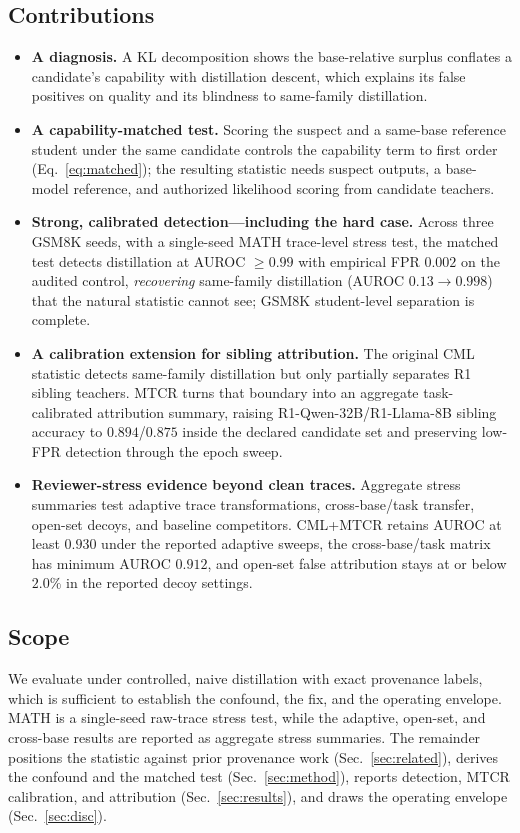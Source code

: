 \documentclass[journal]{IEEEtran}
\begin{document}
\subsection{Contributions}
\begin{itemize}
  \item \textbf{A diagnosis.} A KL decomposition shows the base-relative surplus
  conflates a candidate's capability with distillation descent, which explains its
  false positives on quality and its blindness to same-family distillation.
  \item \textbf{A capability-matched test.} Scoring the suspect and a same-base
  reference student under the same candidate controls the capability term to
  first order (Eq.~\eqref{eq:matched}); the resulting statistic needs suspect outputs, a
  base-model reference, and authorized likelihood scoring from candidate teachers.
  \item \textbf{Strong, calibrated detection---including the hard case.} Across three
  GSM8K seeds, with a single-seed MATH trace-level stress test, the matched test detects distillation at AUROC $\geq0.99$
  with empirical FPR $0.002$ on the audited control, \emph{recovering} same-family distillation (AUROC $0.13\!\to\!0.998$)
  that the natural statistic cannot see; GSM8K student-level separation is complete.
  \item \textbf{A calibration extension for sibling attribution.} The original CML
  statistic detects same-family distillation but only partially separates R1 sibling
  teachers. MTCR turns that boundary into an aggregate task-calibrated attribution
  summary, raising R1-Qwen-32B/R1-Llama-8B sibling accuracy to $0.894$/$0.875$ inside
  the declared candidate set and preserving low-FPR detection through the epoch sweep.
  \item \textbf{Reviewer-stress evidence beyond clean traces.} Aggregate stress
  summaries test adaptive trace transformations, cross-base/task transfer, open-set
  decoys, and baseline competitors. CML+MTCR retains AUROC at least $0.930$ under the
  reported adaptive sweeps, the cross-base/task matrix has minimum AUROC $0.912$, and
  open-set false attribution stays at or below $2.0\%$ in the reported decoy
  settings.
\end{itemize}

\subsection{Scope}
We evaluate under controlled, naive distillation with exact provenance labels, which
is sufficient to establish the confound, the fix, and the operating envelope. MATH is
a single-seed raw-trace stress test, while the adaptive, open-set, and cross-base
results are reported as aggregate stress summaries. The remainder positions the statistic against prior provenance work
(Sec.~\ref{sec:related}), derives the confound and the matched test
(Sec.~\ref{sec:method}), reports detection, MTCR calibration, and attribution
(Sec.~\ref{sec:results}), and draws the operating envelope (Sec.~\ref{sec:disc}).
\end{document}
